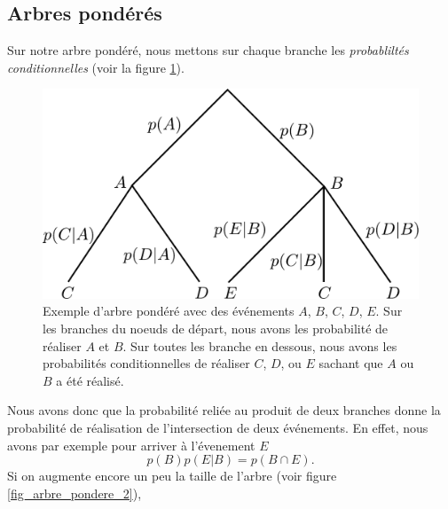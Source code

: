 \documentclass[a4paper,12pt]{book}
\begin{document}
\subsection{Arbres pondérés}

Sur notre arbre pondéré, nous mettons sur chaque branche les \textit{probabliltés conditionnelles}
(voir la figure \ref{fig_arbre_pondere}).
\begin{figure}[htp]
\begin{center}
\includegraphics[height=4.8truecm]{figs/arbre_pondere.pdf}
\end{center}
\caption{Exemple d'arbre pondéré avec des événements $A$, $B$, $C$, $D$, $E$. Sur les branches du noeuds de départ, nous avons les probabilité de réaliser $A$ et $B$.
Sur toutes les branche en dessous, nous avons les probabilités conditionnelles de réaliser $C$, $D$, ou $E$ sachant que $A$ ou $B$ a été réalisé.}\label{fig_arbre_pondere}
\end{figure}
Nous avons donc que la probabilité reliée au produit de deux branches donne la probabilité de réalisation de l'intersection
de deux événements. En effet, nous avons par exemple pour arriver à l'évenement $E$
\begin{equation}
 p(B)p(E|B)=p(B\cap E).
\end{equation}
Si on augmente encore un peu la taille de l'arbre (voir figure \ref{fig_arbre_pondere_2}),
\end{document}
